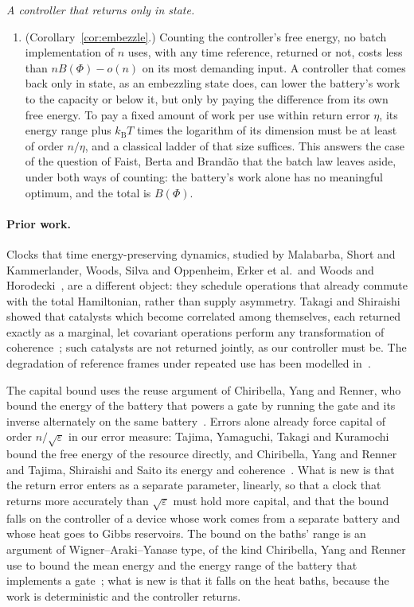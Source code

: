 \documentclass[11pt]{article}
\theoremstyle{definition}
\theoremstyle{remark}
\newcommand{\kB}{k_{\mathrm B}}
\begin{document}
\emph{A controller that returns only in state.}
\begin{enumerate}[label=(\roman*),resume]
\item (Corollary~\ref{cor:embezzle}.) Counting the controller's free energy, no batch implementation of $n$ uses, with any time reference, returned or not, costs less than $nB(\Phi)-o(n)$ on its most demanding input. A controller that comes back only in state, as an embezzling state does, can lower the battery's work to the capacity or below it, but only by paying the difference from its own free energy. To pay a fixed amount of work per use within return error $\eta$, its energy range plus $\kB T$ times the logarithm of its dimension must be at least of order $n/\eta$, and a classical ladder of that size suffices. This answers the case of the question of Faist, Berta and Brand\~ao that the batch law leaves aside, under both ways of counting: the battery's work alone has no meaningful optimum, and the total is $B(\Phi)$.
\end{enumerate}

\paragraph{Prior work.} Clocks that time energy-preserving dynamics, studied by Malabarba, Short and Kammerlander, Woods, Silva and Oppenheim, Erker et al.\ and Woods and Horodecki~\cite{MalabarbaShortKammerlander15,WoodsSilvaOppenheim19,Erker17,WoodsHorodecki23}, are a different object: they schedule operations that already commute with the total Hamiltonian, rather than supply asymmetry. Takagi and Shiraishi showed that catalysts which become correlated among themselves, each returned exactly as a marginal, let covariant operations perform any transformation of coherence~\cite{TakagiShiraishi22}; such catalysts are not returned jointly, as our controller must be. The degradation of reference frames under repeated use has been modelled in~\cite{BRST06,PoulinYard07}.

The capital bound uses the reuse argument of Chiribella, Yang and Renner, who bound the energy of the battery that powers a gate by running the gate and its inverse alternately on the same battery~\cite{ChiribellaYangRenner21}. Errors alone already force capital of order $n/\sqrt\varepsilon$ in our error measure: Tajima, Yamaguchi, Takagi and Kuramochi bound the free energy of the resource directly, and Chiribella, Yang and Renner and Tajima, Shiraishi and Saito its energy and coherence~\cite{ChiribellaYangRenner21,TSS20,TYTK25}. What is new is that the return error enters as a separate parameter, linearly, so that a clock that returns more accurately than $\sqrt\varepsilon$ must hold more capital, and that the bound falls on the controller of a device whose work comes from a separate battery and whose heat goes to Gibbs reservoirs. The bound on the baths' range is an argument of Wigner--Araki--Yanase type, of the kind Chiribella, Yang and Renner use to bound the mean energy and the energy range of the battery that implements a gate~\cite{ChiribellaYangRenner21}; what is new is that it falls on the heat baths, because the work is deterministic and the controller returns.
\end{document}
